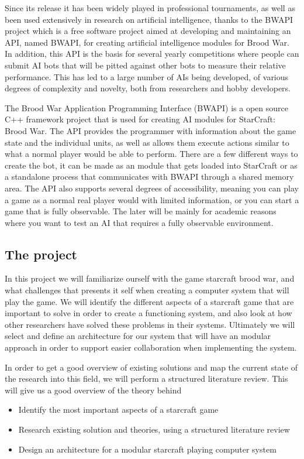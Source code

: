 Since its release it has been widely played in professional tournaments, as well
as been used extensively in research on artificial intelligence, thanks to the
BWAPI project which is a free software project aimed at developing and
maintaining an API, named BWAPI, for creating artificial intelligence modules
for Brood War. In addition, this API is the basis for several yearly
competitions where people can submit AI bots that will be pitted against other
bots to measure their relative performance. This has led to a large number of
AIs being developed, of various degrees of complexity and novelty, both from
researchers and hobby developers. 

The Brood War Application Programming Interface (BWAPI) is a open source C++
framework project that is used for creating AI modules for StarCraft: Brood War.
The API provides the programmer with information about the game state and the
individual units, as well as allows them execute actions similar to what a
normal player would be able to perform. There are a few different ways to create
the bot, it can be made as an module that gets loaded into StarCraft or as a
standalone process that communicates with BWAPI through a shared memory area.
The API also supports several degrees of accessibility, meaning you can play a
game as a normal real player would with limited information, or you can start a
game that is fully observable. The later will be mainly for academic reasons
where you want to test an AI that requires a fully observable environment.  

\subsection{The project}
In this project we will familiarize ourself with the game starcraft brood war, and what challenges that presents it self when creating a computer system that will play the game. We will identify the different aspects of a starcraft game that are important to solve in order to create a functioning system, and also look at how other researchers have solved these problems in their systems. Ultimately we will select and define an architecture for our system that will have an modular approach in order to support easier collaboration when implementing the system. 

In order to get a good overview of existing solutions and map the current state of the research into this field, we will perform a structured literature review. This will give us a good overview of the theory behind 
\begin{itemize}
\item Identify the most important aspects of a starcraft game
\item Research existing solution and theories, using a structured literature review
\item Design an architecture for a modular starcraft playing computer system
\end{itemize}

